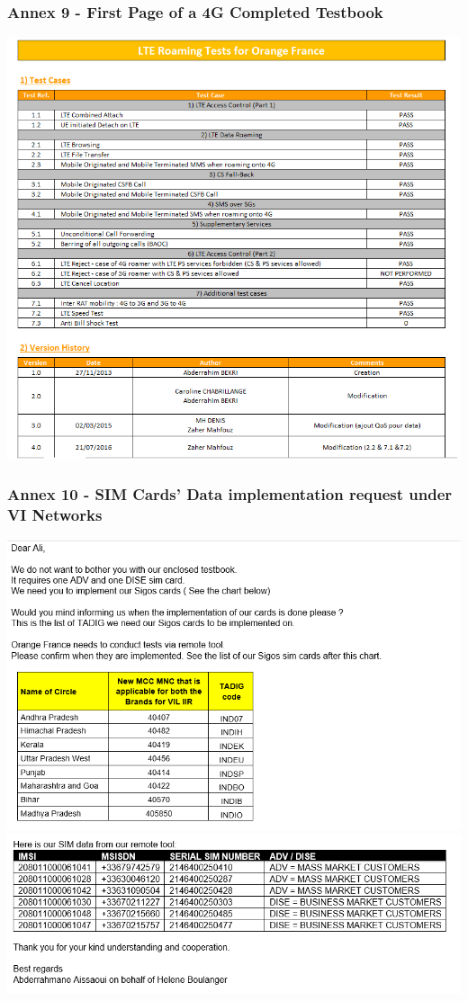 \subsubsection*{Annex 9 - First Page of a \acs{4G} Completed Testbook}
\begin{center}
\includegraphics[scale=1]{annexs/LTE roaming test book.PNG}
\end{center}

\subsubsection*{Annex 10 - \acs{SIM} Cards' Data implementation request under VI Networks}
\begin{center}
\includegraphics[scale=1.3]{annexs/vimail.PNG}
\includegraphics[scale=1.1]{annexs/vimail2.PNG}
\end{center}

